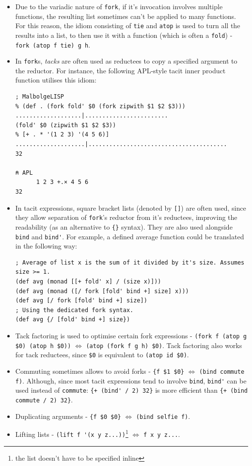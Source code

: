 \begin{itemize}
    \item Due to the variadic nature of \verb|fork|, if it's invocation involves multiple functions, the resulting list sometimes can't be applied to many functions. For this reason, the idiom consisting of \verb|tie| and \verb|atop| is used to turn all the results into a list, to then use it with a function (which is often a \verb|fold|) - \verb|fork (atop f tie) g h|.
    \item In \verb|fork|s, \textit{tacks} are often used as reductees to copy a specified argument to the reductor. For instance, the following APL-style tacit inner product function utilises this idiom: \begin{verbatim}
; MalbolgeLISP
% (def . (fork fold' $0 (fork zipwith $1 $2 $3)))
...................|........................
(fold' $0 (zipwith $1 $2 $3))
% [+ . * '(1 2 3) '(4 5 6)]
....................|........................................
32

⍝ APL
      1 2 3 +.× 4 5 6
32
    \end{verbatim}
    \item In tacit expressions, square bracket lists (denoted by \verb|[]|) are often used, since they allow separation of \verb|fork|'s reductor from it's reductees, improving the readability (as an alternative to \verb|{}| syntax). They are also used alongside \verb|bind| and \verb|bind'|. For example, a defined average function could be translated in the following way:
    \begin{verbatim}
; Average of list x is the sum of it divided by it's size. Assumes size >= 1.
(def avg (monad [[+ fold' x] / (size x)]))
(def avg (monad ([/ fork [fold' bind +] size] x)))
(def avg [/ fork [fold' bind +] size])
; Using the dedicated fork syntax.
(def avg {/ [fold' bind +] size})
    \end{verbatim}
    \item Tack factoring is used to optimise certain fork expressions - \verb|(fork f (atop g $0) (atop h $0))| $\Leftrightarrow$ \verb|(atop (fork f g h) $0)|. Tack factoring also works for tack reductees, since \verb|$0| is equivalent to \verb|(atop id $0)|.
    \item Commuting sometimes allows to avoid forks - \verb|{f $1 $0}| $\Leftrightarrow$ \verb|(bind commute f)|. Although, since most tacit expressions tend to involve \verb|bind|, \verb|bind'| can be used instead of \verb|commute|: \verb|{+ (bind' / 2) 32}| is more efficient than \verb|{+ (bind commute / 2) 32}|.
    \item Duplicating arguments - \verb|{f $0 $0}| $\Leftrightarrow$ \verb|(bind selfie f)|.
    \item Lifting lists - \verb|(lift f '(x y z...))|\footnote{the list doesn't have to be specified inline} $\Leftrightarrow$ \verb|f x y z...|.
\end{itemize}

